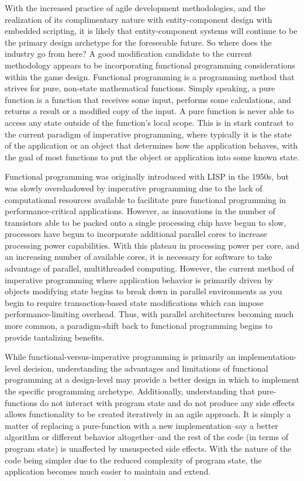 With the increased practice of agile development methodologies, and the realization of its complimentary nature with entity-component design with embedded scripting, it is likely that entity-component systems will continue to be the primary design archetype for the foreseeable future. So where does the industry go from here? A good modification candidate to the current methodology appears to be incorporating functional programming considerations within the game design. Functional programming is a programming method that strives for pure, non-state mathematical functions. Simply speaking, a pure function is a function that receives some input, performs some calculations, and returns a result or a modified copy of the input. A pure function is never able to access any state outside of the function's local scope. This is in stark contrast to the current paradigm of imperative programming, where typically it is the state of the application or an object that determines how the application behaves, with the goal of most functions to put the object or application into some known state.

Functional programming was originally introduced with LISP in the 1950s, but was slowly overshadowed by imperative programming due to the lack of computational resources available to facilitate pure functional programming in performance-critical applications. However, as innovations in the number of transistors able to be packed onto a single processing chip have begun to slow, processors have begun to incorporate additional parallel cores to increase processing power capabilities. With this plateau in processing power per core, and an increasing number of available cores, it is necessary for software to take advantage of parallel, multithreaded computing. However, the current method of imperative programming where application behavior is primarily driven by objects modifying state begins to break down in parallel environments as you begin to require transaction-based state modifications which can impose performance-limiting overhead. Thus, with parallel architectures becoming much more common, a paradigm-shift back to functional programming begins to provide tantalizing benefits.

While functional-versus-imperative programming is primarily an implementation-level decision, understanding the advantages and limitations of functional programming at a design-level may provide a better design in which to implement the specific programming archetype. Additionally, understanding that pure-functions do not interact with program state and do not produce any side effects allows functionality to be created iteratively in an agile approach. It is simply a matter of replacing a pure-function with a new implementation--say a better algorithm or different behavior altogether--and the rest of the code (in terms of program state) is unaffected by unsuspected side effects. With the nature of the code being simpler due to the reduced complexity of program state, the application becomes much easier to maintain and extend.

